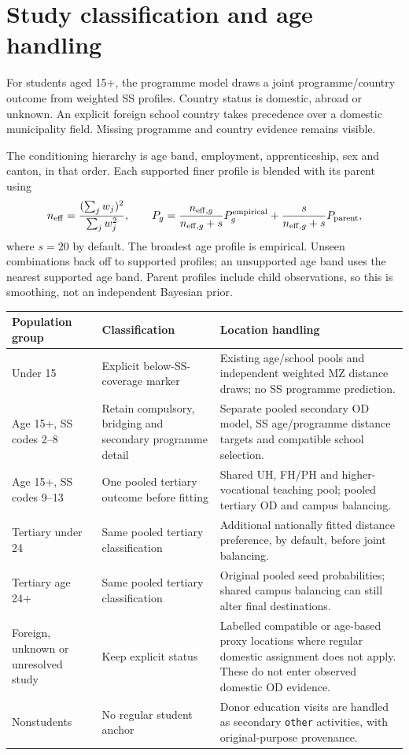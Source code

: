\documentclass[11pt,a4paper]{article}
\newcommand{\code}[1]{\nolinkurl{#1}}
\begin{document}
\section{Study classification and age handling}

For students aged 15+, the programme model draws a joint programme/country
outcome from weighted SS profiles. Country status is domestic, abroad or
unknown. An explicit foreign school country takes precedence over a domestic
municipality field. Missing programme and country evidence remains visible.

The conditioning hierarchy is age band, employment, apprenticeship, sex and
canton, in that order. Each supported finer profile is blended with its
parent using
\[
 n_{\mathrm{eff}}=\frac{(\sum_j w_j)^2}{\sum_j w_j^2},\qquad
 P_g=\frac{n_{\mathrm{eff},g}}{n_{\mathrm{eff},g}+s}P_g^{\rm empirical}
       +\frac{s}{n_{\mathrm{eff},g}+s}P_{\rm parent},
\]
where \(s=20\) by default. The broadest age profile is empirical. Unseen
combinations back off to supported profiles; an unsupported age band uses the
nearest supported age band. Parent profiles include child observations, so this
is smoothing, not an independent Bayesian prior.

\begin{longtable}{L{.19\textwidth}L{.32\textwidth}L{.41\textwidth}}
\toprule Population group & Classification & Location handling \\
\midrule\endhead
Under 15 & Explicit below-SS-coverage marker & Existing age/school pools and
independent weighted MZ distance draws; no SS programme prediction. \\
Age 15+, SS codes 2--8 & Retain compulsory, bridging and secondary programme
detail & Separate pooled secondary OD model, SS age/programme distance targets
and compatible school selection. \\
Age 15+, SS codes 9--13 & One pooled tertiary outcome before fitting & Shared
UH, FH/PH and higher-vocational teaching pool; pooled tertiary OD and campus balancing. \\
Tertiary under 24 & Same pooled tertiary classification & Additional nationally
fitted distance preference, by default, before joint balancing. \\
Tertiary age 24+ & Same pooled tertiary classification & Original pooled seed
probabilities; shared campus balancing can still alter final destinations. \\
Foreign, unknown or unresolved study & Keep explicit status & Labelled
compatible or age-based proxy locations where regular domestic assignment does
not apply. These do not enter observed domestic OD evidence. \\
Nonstudents & No regular student anchor & Donor education visits are handled
as secondary \code{other} activities, with original-purpose provenance. \\
\bottomrule
\end{longtable}
\end{document}
